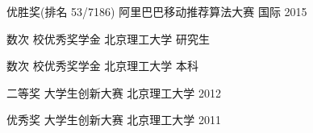 




\begin{cvhonors}

\cvhonor
{优胜奖(排名 53/7186)} %
{阿里巴巴移动推荐算法大赛} %
{ 国际} %
{2015} %

\cvhonor
{数次} %
{校优秀奖学金} %
{北京理工大学} %
{研究生} %


\cvhonor
{数次} %
{校优秀奖学金} %
{北京理工大学} %
{本科} %

\cvhonor
{二等奖} %
{大学生创新大赛} %
{北京理工大学} %
{2012} %

\cvhonor
{优秀奖} %
{大学生创新大赛} %
{北京理工大学} %
{2011} %








\end{cvhonors}
